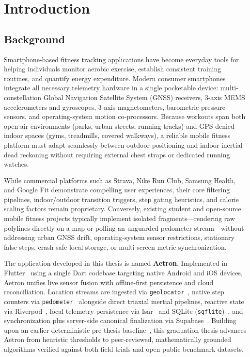 \chapter{Introduction}
\label{ch:introduction}

\section{Background}
Smartphone-based fitness tracking applications have become everyday tools for helping individuals monitor aerobic exercise, establish consistent training routines, and quantify energy expenditure. Modern consumer smartphones integrate all necessary telemetry hardware in a single pocketable device: multi-constellation Global Navigation Satellite System (GNSS) receivers, 3-axis MEMS accelerometers and gyroscopes, 3-axis magnetometers, barometric pressure sensors, and operating-system motion co-processors. Because workouts span both open-air environments (parks, urban streets, running tracks) and GPS-denied indoor spaces (gyms, treadmills, covered walkways), a reliable mobile fitness platform must adapt seamlessly between outdoor positioning and indoor inertial dead reckoning without requiring external chest straps or dedicated running watches.

While commercial platforms such as Strava, Nike Run Club, Samsung Health, and Google Fit demonstrate compelling user experiences, their core filtering pipelines, indoor/outdoor transition triggers, step gating heuristics, and calorie scaling factors remain proprietary. Conversely, existing student and open-source mobile fitness projects typically implement isolated fragments---rendering raw polylines directly on a map or polling an unguarded pedometer stream---without addressing urban GNSS drift, operating-system sensor restrictions, stationary false steps, crash-safe local storage, or multi-screen metric synchronization.

The application developed in this thesis is named \textbf{Aetron}. Implemented in Flutter~\cite{flutter2024framework} using a single Dart codebase targeting native Android and iOS devices, Aetron unifies live sensor fusion with offline-first persistence and cloud reconciliation. Location streams are ingested via \texttt{geolocator}~\cite{geolocator2024}, native step counters via \texttt{pedometer}~\cite{pedometer2024} alongside direct triaxial inertial pipelines, reactive state via Riverpod~\cite{riverpod2024state}, local telemetry persistence via Isar~\cite{isar2024database} and SQLite (\texttt{sqflite})~\cite{sqflite2024}, and synchronization plus server-side canonical finalization via Supabase~\cite{supabase2024backend}. Building upon an earlier deterministic pre-thesis baseline~\cite{aetron2026prethesis}, this graduation thesis advances Aetron from heuristic thresholds to peer-reviewed, mathematically grounded algorithms verified against both field trials and open public benchmark datasets.

